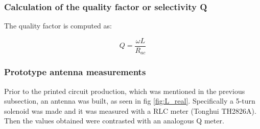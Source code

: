\documentclass[a4paper, 10pt, conference]{ieeeconf}      %
\begin{document}


\subsubsection{Calculation of the quality factor or selectivity Q}
The quality factor is computed as:

\begin{equation}
{Q =\frac{\omega L}{R_{ac}}}
\end{equation}


\subsubsection{Prototype antenna measurements}
Prior to the printed circuit production, which was mentioned in the previous subsection, an antenna was built, as seen in fig \ref{fig:L_real}. Specifically a 5-turn solenoid was made and it was measured with a RLC meter (Tonghui TH2826A). Then the values obtained were contrasted with an analogous Q meter.
\end{document}
